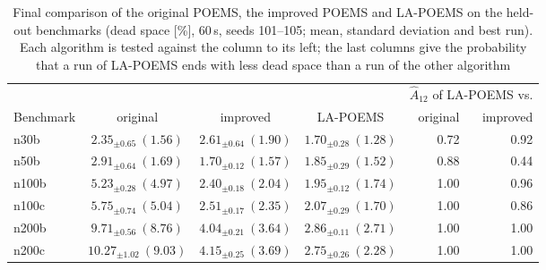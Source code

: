 \begin{table}
\centering
\footnotesize
\setlength{\tabcolsep}{4pt}
\begin{tabular}{@{}lcccrr@{}}
\toprule
 &  &  &  & \multicolumn{2}{c}{$\hat{A}_{12}$ of LA-POEMS vs.} \\
Benchmark & original & improved & LA-POEMS & original & improved \\
\midrule
n30b & $2.35_{\pm 0.65}\ (1.56)$ & $2.61_{\pm 0.64}\ (1.90)$ & $\mathbf{1.70_{\pm 0.28}\ (1.28)}$ & 0.72 & 0.92 \\
n50b & $2.91_{\pm 0.64}\ (1.69)$ & $1.70_{\pm 0.12}\ (1.57)$ & $1.85_{\pm 0.29}\ (1.52)$ & 0.88 & 0.44 \\
n100b & $5.23_{\pm 0.28}\ (4.97)$ & $\mathbf{2.40_{\pm 0.18}\ (2.04)}$ & $\mathbf{1.95_{\pm 0.12}\ (1.74)}$ & 1.00 & 0.96 \\
n100c & $5.75_{\pm 0.74}\ (5.04)$ & $\mathbf{2.51_{\pm 0.17}\ (2.35)}$ & $2.07_{\pm 0.29}\ (1.70)$ & 1.00 & 0.86 \\
n200b & $9.71_{\pm 0.56}\ (8.76)$ & $\mathbf{4.04_{\pm 0.21}\ (3.64)}$ & $\mathbf{2.86_{\pm 0.11}\ (2.71)}$ & 1.00 & 1.00 \\
n200c & $10.27_{\pm 1.02}\ (9.03)$ & $\mathbf{4.15_{\pm 0.25}\ (3.69)}$ & $\mathbf{2.75_{\pm 0.26}\ (2.28)}$ & 1.00 & 1.00 \\
\bottomrule
\end{tabular}
\caption{Final comparison of the original POEMS, the improved POEMS and LA-POEMS on the held-out benchmarks (dead space [\%], 60\,s, seeds 101--105; mean, standard deviation and best run). Each algorithm is tested against the column to its left; the last columns give the probability that a run of LA-POEMS ends with less dead space than a run of the other algorithm}
\label{tab:heldout}
\end{table}
